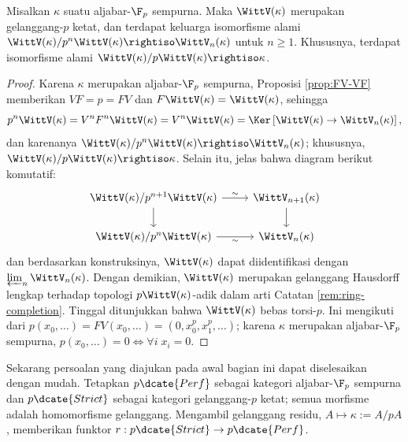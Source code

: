 \begin{lemma}\label{prop:Witt-p-strict}
	Misalkan $\kappa$ suatu aljabar-$\F_p$ sempurna. Maka $\WittV(\kappa)$ merupakan gelanggang-$p$ ketat, dan terdapat keluarga isomorfisme alami $\WittV(\kappa)/p^n \WittV(\kappa) \rightiso \WittV_n(\kappa)$ untuk $n \geq 1$. Khususnya, terdapat isomorfisme alami $\WittV(\kappa)/p\WittV(\kappa) \rightiso \kappa$.
\end{lemma}
\begin{proof}
	Karena $\kappa$ merupakan aljabar-$\F_p$ sempurna, Proposisi \ref{prop:FV-VF} memberikan $VF = p = FV$ dan $F \WittV(\kappa) = \WittV(\kappa)$, sehingga
	\[ p^n \WittV(\kappa) = V^n F^n \WittV(\kappa) = V^n \WittV(\kappa) = \Ker \left[ \WittV(\kappa) \to \WittV_n(\kappa) \right], \]
	dan karenanya $\WittV(\kappa)/p^n \WittV(\kappa) \rightiso \WittV_n(\kappa)$; khususnya, $\WittV(\kappa)/p\WittV(\kappa) \rightiso \kappa$. Selain itu, jelas bahwa diagram berikut komutatif:
	\[\begin{tikzcd}
		\WittV(\kappa)/p^{n+1} \WittV(\kappa) \arrow[r, "\sim"] \arrow[d] & \WittV_{n+1}(\kappa) \arrow[d] \\
		\WittV(\kappa)/p^n \WittV(\kappa) \arrow[r, "\sim"'] & \WittV_n(\kappa)
	\end{tikzcd}\]
	dan berdasarkan konstruksinya, $\WittV(\kappa)$ dapat diidentifikasi dengan $\varprojlim_n \WittV_n(\kappa)$. Dengan demikian, $\WittV(\kappa)$ merupakan gelanggang Hausdorff lengkap terhadap topologi $p\WittV(\kappa)$-adik dalam arti Catatan \ref{rem:ring-completion}. Tinggal ditunjukkan bahwa $\WittV(\kappa)$ bebas torsi-$p$. Ini mengikuti dari $p(x_0, \ldots) = FV(x_0, \ldots)= (0, x_0^p, x_1^p, \ldots)$; karena $\kappa$ merupakan aljabar-$\F_p$ sempurna, $p(x_0, \ldots) = 0 \iff \forall i\; x_i=0$.
\end{proof}

Sekarang persoalan yang diajukan pada awal bagian ini dapat diselesaikan dengan mudah. Tetapkan $p\dcate{Perf}$ sebagai kategori aljabar-$\F_p$ sempurna dan $p\dcate{Strict}$ sebagai kategori gelanggang-$p$ ketat; semua morfisme adalah homomorfisme gelanggang. Mengambil gelanggang residu, $A \mapsto \kappa := A/pA$, memberikan funktor $r: p\dcate{Strict} \to p\dcate{Perf}$.

